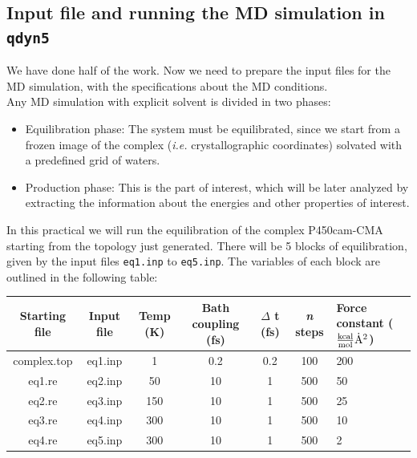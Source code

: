\documentclass[a4paper,12pt]{article}
\newcommand{\qdyn}{\texttt{qdyn5}}
\begin{document}
%
%

\subsection {Input file and running the MD simulation in {\qdyn}}
We have done half of the work. Now we need to prepare the input files for the MD simulation, with the specifications about the MD conditions.\\
Any MD simulation with explicit solvent is divided in two phases:
    \begin {itemize}
    \item Equilibration phase: The system must be equilibrated, since we start from a frozen image of the complex ({\it i.e.} crystallographic coordinates) solvated with a predefined grid of waters.
    \item Production phase: This is the part of interest, which will be later analyzed by extracting the information about the energies and other properties of interest.
    \end {itemize}
In this practical we will run the equilibration of the complex P450cam-CMA starting from the topology just generated. There will be 5 blocks of equilibration, given by the input files \texttt{eq1.inp} to \texttt{eq5.inp}. The variables of each block are outlined in the following table:\\

\begin{center}
\begin{tabularx}{\textwidth}{|c|c|c|c|c|c|X|}
\hline
Starting file & Input file & Temp (K) & Bath coupling (fs) & $\Delta$ t (fs) & {\it n} steps & Force constant ($\mathrm{{kcal \over mol} \dot{A}^{2}}$) \\
\hline
complex.top & eq1.inp & 1 & 0.2 & 0.2 & 100 & 200 \\
eq1.re & eq2.inp & 50 & 10 & 1 & 500 & 50 \\
eq2.re & eq3.inp & 150 & 10 & 1 & 500 & 25 \\
eq3.re & eq4.inp & 300 & 10 & 1 & 500 & 10 \\
eq4.re & eq5.inp & 300 & 10 & 1 & 500 & 2 \\
\hline
\end{tabularx}
\end{center}
\end{document}
